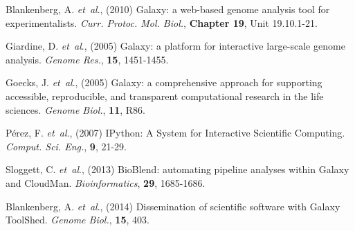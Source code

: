 \documentclass{bioinfo}
\begin{document}
\begin{thebibliography}{}
Blankenberg, A. {\it et~al}., (2010) Galaxy: a web-based genome analysis tool for experimentalists. \textit{Curr. Protoc. Mol. Biol.},  {\bf Chapter 19}, Unit 19.10.1-21.

Giardine, D. {\it et~al}., (2005) Galaxy: a platform for interactive large-scale genome analysis. \textit{Genome Res.},  {\bf 15}, 1451-1455.

Goecks, J. {\it et~al}., (2005) Galaxy: a comprehensive approach for supporting accessible, reproducible, and transparent computational research in the life sciences. \textit{Genome Biol.},  {\bf 11}, R86.

P\'erez, F. {\it et~al}., (2007) IPython: A System for Interactive Scientific Computing. \textit{Comput. Sci. Eng.}, {\bf 9}, 21-29.

Sloggett, C. {\it et~al}., (2013) BioBlend: automating pipeline analyses within Galaxy and CloudMan. \textit{Bioinformatics}, {\bf 29}, 1685-1686.

Blankenberg, A. {\it et~al}., (2014) Dissemination of scientific software with Galaxy ToolShed. \textit{Genome Biol.}, {\bf 15}, 403.



\end{thebibliography}
\end{document}
